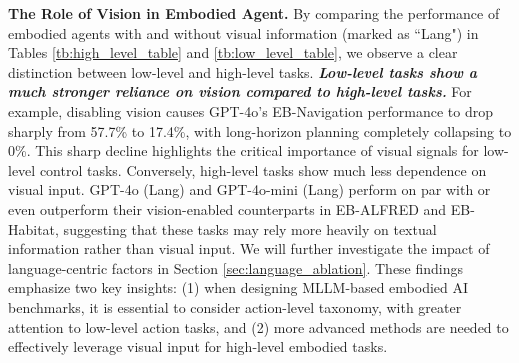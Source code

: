
\textbf{The Role of Vision in Embodied Agent.}
By comparing the performance of embodied agents with and without visual information (marked as ``Lang") in Tables \ref{tb:high_level_table} and \ref{tb:low_level_table}, we observe a clear distinction between low-level and high-level tasks. \textbf{\textit{Low-level tasks show a much stronger reliance on vision compared to high-level tasks.}} For example, disabling vision causes GPT-4o’s EB-Navigation performance to drop sharply from 57.7\% to 17.4\%, with long-horizon planning completely collapsing to 0\%. This sharp decline highlights the critical importance of visual signals for low-level control tasks. Conversely, high-level tasks show much less dependence on visual input. GPT-4o (Lang) and GPT-4o-mini (Lang) perform on par with or even outperform their vision-enabled counterparts in EB-ALFRED and EB-Habitat, suggesting that these tasks may rely more heavily on textual information rather than visual input. We will further investigate the impact of language-centric factors in Section \ref{sec:language_ablation}. These findings emphasize two key insights: (1) when designing MLLM-based embodied AI benchmarks, it is essential to consider action-level taxonomy, with greater attention to low-level action tasks, and (2) more advanced methods are needed to effectively leverage visual input for high-level embodied tasks.



